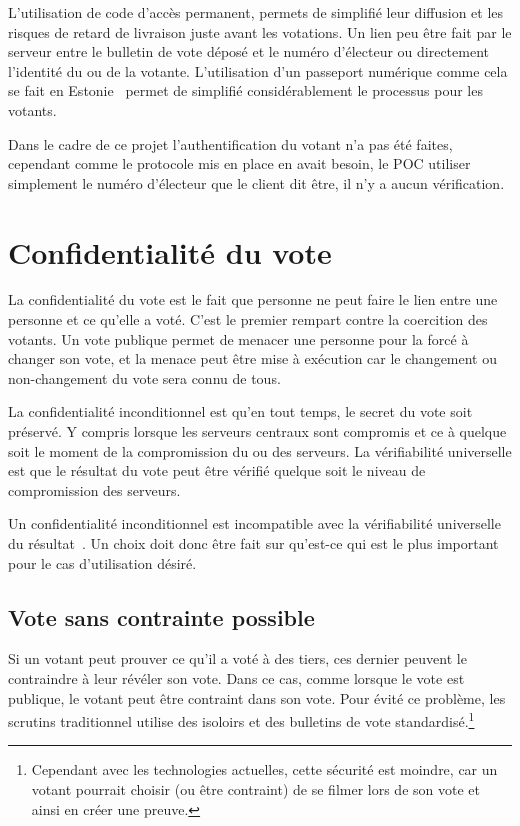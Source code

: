 \documentclass[../report]{subfiles}
\begin{document}
L'utilisation de code d'accès permanent, permets de simplifié leur diffusion et les risques de retard de livraison juste avant les votations.
Un lien peu être fait par le serveur entre le bulletin de vote déposé et le numéro d'électeur ou directement l'identité du ou de la votante.
L'utilisation d'un passeport numérique comme cela se fait en Estonie~\cite{vassil_diffusion_2016} permet de simplifié considérablement le processus
pour les votants.

Dans le cadre de ce projet l'authentification du votant n'a pas été faites, cependant comme le protocole mis en place en avait besoin, le POC utiliser 
simplement le numéro d'électeur que le client dit être, il n'y a aucun vérification.

\section{Confidentialité du vote}

La confidentialité du vote est le fait que personne ne peut faire le lien entre une personne et ce qu'elle a voté.
C'est le premier rempart contre la coercition des votants.
Un vote publique permet de menacer une personne pour la forcé à changer son vote, et la menace peut être mise à exécution
car le changement ou non-changement du vote sera connu de tous.

La confidentialité inconditionnel est qu'en tout temps, le secret du vote soit préservé.
Y compris lorsque les serveurs centraux sont compromis et ce à quelque soit le moment de la 
compromission du ou des serveurs.
La vérifiabilité universelle est que le résultat du vote peut être vérifié quelque soit le niveau de compromission
des serveurs.

Un confidentialité inconditionnel est incompatible avec la vérifiabilité universelle du 
résultat~\cite{chevallier-mames_incompatible_2010,gharadaghy_verifiability_2010}.
Un choix doit donc être fait sur qu'est-ce qui est le plus important pour le cas d'utilisation désiré.

\subsection{Vote sans contrainte possible}

Si un votant peut prouver ce qu'il a voté à des tiers, ces dernier peuvent le contraindre à leur révéler son vote.
Dans ce cas, comme lorsque le vote est publique, le votant peut être contraint dans son vote. 
Pour évité ce problème, les scrutins traditionnel utilise des isoloirs et des bulletins de vote 
standardisé.\footnote{Cependant avec les technologies actuelles, cette sécurité est moindre, car un votant pourrait 
	choisir (ou être contraint) de se filmer lors de son vote et ainsi en créer une preuve.}
\end{document}
